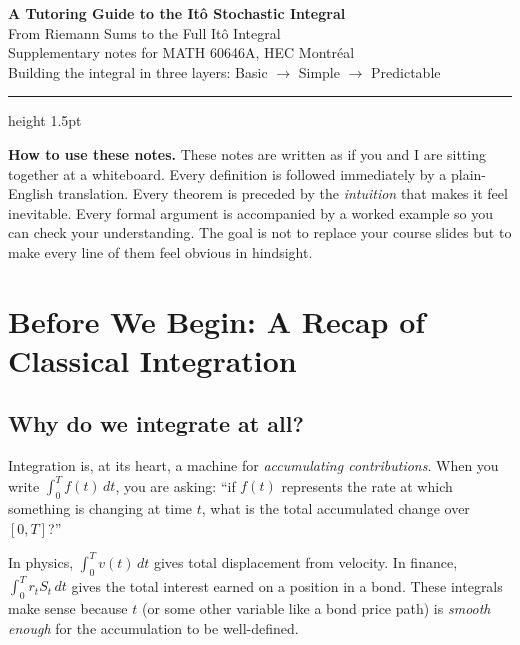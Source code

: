 \documentclass[11pt,a4paper]{article}
\theoremstyle{definition}
\theoremstyle{plain}
\theoremstyle{remark}
\begin{document}

\begin{center}
  {\LARGE\bfseries\color{tutorblue}
    A Tutoring Guide to the It\^{o} Stochastic Integral}\\[8pt]
  {\large\color{tutorgold}
    From Riemann Sums to the Full It\^{o} Integral}\\[6pt]
  {\normalsize Supplementary notes for MATH 60646A, HEC Montr\'eal}\\[4pt]
  {\small Building the integral in three layers: Basic $\to$ Simple $\to$ Predictable}
\end{center}

\vspace{0.5em}
\hrule height 1.5pt
\vspace{0.5em}

\begin{tutobox}
\textbf{How to use these notes.} These notes are written as if you and I are sitting together at a whiteboard. Every definition is followed immediately by a plain-English translation. Every theorem is preceded by the \emph{intuition} that makes it feel inevitable. Every formal argument is accompanied by a worked example so you can check your understanding. The goal is not to replace your course slides but to make every line of them feel obvious in hindsight.
\end{tutobox}

\tableofcontents
\newpage

\section{Before We Begin: A Recap of Classical Integration}
\label{sec:classical}

\subsection{Why do we integrate at all?}

Integration is, at its heart, a machine for \emph{accumulating contributions}. When you write $\int_0^T f(t)\,dt$, you are asking: ``if $f(t)$ represents the rate at which something is changing at time $t$, what is the total accumulated change over $[0,T]$?''

In physics, $\int_0^T v(t)\,dt$ gives total displacement from velocity. In finance, $\int_0^T r_t S_t\,dt$ gives the total interest earned on a position in a bond. These integrals make sense because $t$ (or some other variable like a bond price path) is \emph{smooth enough} for the accumulation to be well-defined.
\end{document}
